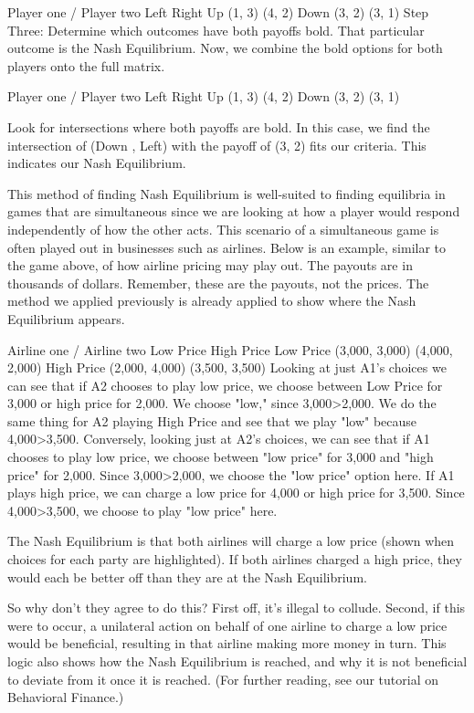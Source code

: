 Player one / Player two	Left	Right
Up	(1, 3)	(4, 2)
Down	(3, 2)	(3, 1)
Step Three: Determine which outcomes have both payoffs bold. That particular outcome is the Nash Equilibrium.
Now, we combine the bold options for both players onto the full matrix.

Player one / Player two	Left	Right
Up	(1, 3)	(4, 2)
Down	(3, 2)	(3, 1)

Look for intersections where both payoffs are bold. In this case, we find the intersection of (Down , Left) with the payoff of (3, 2) fits our criteria. This indicates our Nash Equilibrium.

This method of finding Nash Equilibrium is well-suited to finding equilibria in games that are simultaneous since we are looking at how a player would respond independently of how the other acts. This scenario of a simultaneous game is often played out in businesses such as airlines. Below is an example, similar to the game above, of how airline pricing may play out. The payouts are in thousands of dollars. Remember, these are the payouts, not the prices. The method we applied previously is already applied to show where the Nash Equilibrium appears.

Airline one / Airline two	Low Price	High Price
Low Price	(3,000, 3,000)	(4,000, 2,000)
High Price	(2,000, 4,000)	(3,500, 3,500)
Looking at just A1's choices we can see that if A2 chooses to play low price, we choose between Low Price for 3,000 or high price for 2,000. We choose "low," since 3,000>2,000. We do the same thing for A2 playing High Price and see that we play "low" because 4,000>3,500. Conversely, looking just at A2's choices, we can see that if A1 chooses to play low price, we choose between "low price" for 3,000 and "high price" for 2,000. Since 3,000>2,000, we choose the "low price" option here. If A1 plays high price, we can charge a low price for 4,000 or high price for 3,500. Since 4,000>3,500, we choose to play "low price" here.

The Nash Equilibrium is that both airlines will charge a low price (shown when choices for each party are highlighted). If both airlines charged a high price, they would each be better off than they are at the Nash Equilibrium.

So why don't they agree to do this? First off, it's illegal to collude. Second, if this were to occur, a unilateral action on behalf of one airline to charge a low price would be beneficial, resulting in that airline making more money in turn. This logic also shows how the Nash Equilibrium is reached, and why it is not beneficial to deviate from it once it is reached. (For further reading, see our tutorial on Behavioral Finance.)

